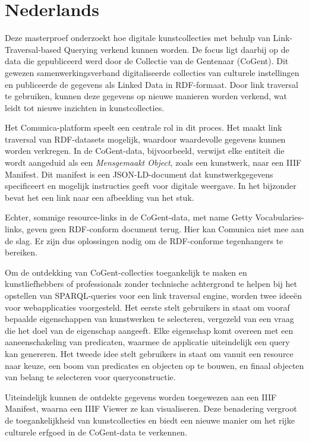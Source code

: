 \newpage
\pagestyle{plainpage}

\section*{Nederlands}

Deze masterproef onderzoekt hoe digitale kunstcollecties met behulp van Link-Traversal-based Querying verkend kunnen worden. De focus ligt daarbij op de data die gepubliceerd werd door de Collectie van de Gentenaar (CoGent). Dit gewezen samenwerkingsverband digitaliseerde collecties van culturele instellingen en publiceerde de gegevens als Linked Data in RDF-formaat. Door link traversal te gebruiken, kunnen deze gegevens op nieuwe manieren worden verkend, wat leidt tot nieuwe inzichten in kunstcollecties.

Het Comunica-platform speelt een centrale rol in dit proces. Het maakt link traversal van RDF-datasets mogelijk, waardoor waardevolle gegevens kunnen worden verkregen. In de CoGent-data, bijvoorbeeld, verwijst elke entiteit die wordt aangeduid als een \textit{Mensgemaakt Object}, zoals een kunstwerk, naar een IIIF Manifest. Dit manifest is een JSON-LD-document dat kunstwerkgegevens specificeert en mogelijk instructies geeft voor digitale weergave. In het bijzonder bevat het een link naar een afbeelding van het stuk.

Echter, sommige resource-links in de CoGent-data, met name Getty Vocabularies-links, geven geen RDF-conform document terug. Hier kan Comunica niet mee aan de slag. Er zijn dus oplossingen nodig om de RDF-conforme tegenhangers te bereiken.

Om de ontdekking van CoGent-collecties toegankelijk te maken en kunstliefhebbers of professionals zonder technische achtergrond te helpen bij het opstellen van SPARQL-queries voor een link traversal engine, worden twee ideeën voor webapplicaties voorgesteld. Het eerste stelt gebruikers in staat om vooraf bepaalde eigenschappen van kunstwerken te selecteren, vergezeld van een vraag die het doel van de eigenschap aangeeft. Elke eigenschap komt overeen met een aaneenschakeling van predicaten, waarmee de applicatie uiteindelijk een query kan genereren. Het tweede idee stelt gebruikers in staat om vanuit een resource naar keuze, een boom van predicates en objecten op te bouwen, en finaal objecten van belang te selecteren voor queryconstructie.

Uiteindelijk kunnen de ontdekte gegevens worden toegewezen aan een IIIF Manifest, waarna een IIIF Viewer ze kan visualiseren. Deze benadering vergroot de toegankelijkheid van kunstcollecties en biedt een nieuwe manier om het rijke culturele erfgoed in de CoGent-data te verkennen.